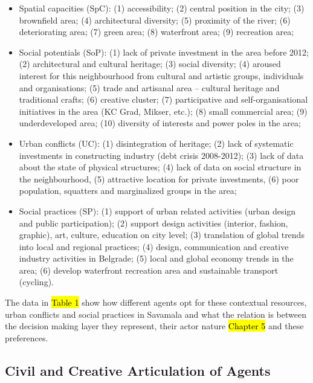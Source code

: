 \documentclass[11pt]{report}
\begin{document}
\begin{itemize}
\item Spatial capacities (SpC):  (1) accessibility; (2) central position in the city; (3) brownfield area; (4) architectural diversity; (5) proximity of the river; (6) deteriorating area; (7) green area; (8) waterfront area; (9) recreation area;
\item Social potentials (SoP): (1) lack of private investment in the area before 2012; (2) architectural and cultural heritage; (3) social diversity; (4) aroused interest for this neighbourhood from cultural and artistic groups, individuals and organisations; (5) trade and artisanal area – cultural heritage and traditional crafts; (6) creative cluster; (7) participative and self-organisational initiatives in the area (KC Grad, Mikser, etc.); (8) small commercial area; (9) underdeveloped area; (10) diversity of interests and power poles in the area;
\item Urban conflicts (UC): (1) disintegration of heritage; (2) lack of systematic investments in constructing industry (debt crisis 2008-2012); (3) lack of data about the state of physical structures; (4) lack of data on social structure in the neighbourhood, (5) attractive location for private investments, (6) poor population, squatters and marginalized groups in the area;
\item Social practices (SP): (1) support of urban related activities (urban design and public participation); (2) support design activities (interior, fashion, graphic), art, culture, education on city level; (3) translation of global trends into local and regional practices; (4) design, communication and creative industry activities in Belgrade; (5) local and global economy trends in the area; (6) develop waterfront recreation area and sustainable transport (cycling).
\end{itemize}

The data in \hl{Table 1} show how different agents opt for these contextual resources, urban conflicts and social practices in Savamala and what the relation is between the decision making layer they represent, their actor nature \hl{Chapter 5} and these preferences. 

\subsection{Civil and Creative Articulation of Agents}
\end{document}
